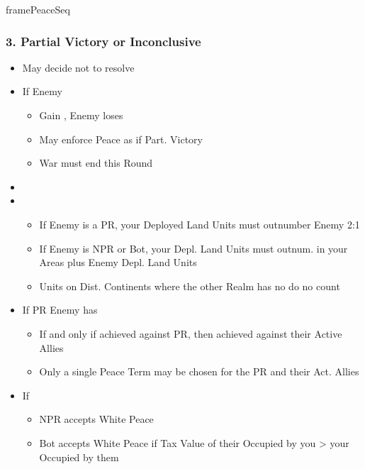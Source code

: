 \documentclass[10pt]{article}
\newlength{\fhPeaceSeq} \setlength\fhPeaceSeq{23.5\baselineskip}
\begin{document}
\begin{dynamiccontents*}{framePeaceSeq}
\begin{eubox}{\fhPeaceSeq}
\begin{multicols}{3}
		\subsubsection*{3. Partial Victory or Inconclusive}
		\begin{itemize}
			\item May decide not to resolve
			\item If Enemy 
			\begin{itemize}
				\item Gain \p2, Enemy loses 
				\item May enforce Peace as if Part. Victory
				\item War must end this Round
			\end{itemize}
			\item {}
			\item {}
			\begin{itemize}
				\item If Enemy is a PR, your Deployed Land Units must outnumber Enemy 2:1
				\item If Enemy is NPR or Bot, your Depl. Land Units must outnum. \rebels in your Areas plus Enemy Depl. Land Units
				\item Units on Dist. Continents where the other Realm has no \towns do no count
			\end{itemize}
			\item If PR Enemy has 
			\begin{itemize}
				\item If and only if achieved against PR, then achieved against their Active Allies
				\item Only a single Peace Term may be chosen for the PR and their Act. Allies
			\end{itemize}
			\item If 
			\begin{itemize}
				\item NPR accepts White Peace
				\item Bot accepts White Peace if Tax Value of their \towns Occupied by you > your \towns Occupied by them
			\end{itemize}
		\end{itemize}


\end{multicols}
\end{eubox}
\end{dynamiccontents*}
\end{document}
